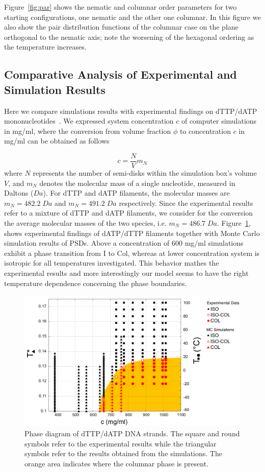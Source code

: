 \documentclass[aip,jcp, amsmath, amssymb, reprint]{revtex4-1}
\begin{document}
 Figure~\ref{fig:par} shows the nematic and columnar order parameters for two starting configurations, one nematic and the other one columnar. In this figure we also show the pair 
 distribution functions of the columnar case on the plane orthogonal to the nematic axis; note the worsening of the hexagonal ordering as the temperature increases.


\subsection{Comparative Analysis of Experimental and Simulation Results}

Here we compare simulations results with experimental findings on dTTP/dATP mononucleotides~\cite{Smith}.
We expressed system concentration $c$ of computer simulations in mg/ml, where the conversion 
from volume fraction $\phi$ to concentration $c$ in mg/ml can be obtained as follows

\begin{equation}
	c=\frac{N}{V}m_N
	\label{conc}
\end{equation}
where $N$ represents the number of semi-disks within the simulation box's volume $V$, and $m_N$ denotes the molecular mass of a single nucleotide, measured in Daltons ($Da$). For dTTP and dATP filaments, the molecular masses are $m_N=482.2\; Da$ and $m_N=491.2\; Da$ respectively. Since the experimental results refer to a mixture of dTTP and dATP filaments, we consider for
the conversion the average molecular masses of the two species, i.e. $m_N=486.7\; Da$. 
Figure~\ref{fig:wide}, shows experimental findings of dATP/dTTP filaments \cite{Smith} together with Monte Carlo simulation results of PSDs. 
Above a concentration of 600 mg/ml simulations exhibit a phase transition from I to Col, whereas at lower concentration
system is isotropic for all temperatures investigated. This behavior mathes the experimental results and more interestingly
our model seems to have the right temperature dependence concerning the phase boundaries.

\begin{figure}[t!] \includegraphics[width=0.7\linewidth]{finaleeng.png} \caption{\label{fig:wide}Phase diagram of
    dTTP/dATP DNA strands. The square and round symbols refer to the experimental results while the triangular symbols
  refer to the results obtained from the simulations. The orange area indicates where the columnar phase is present.}
\end{figure}
\end{document}
